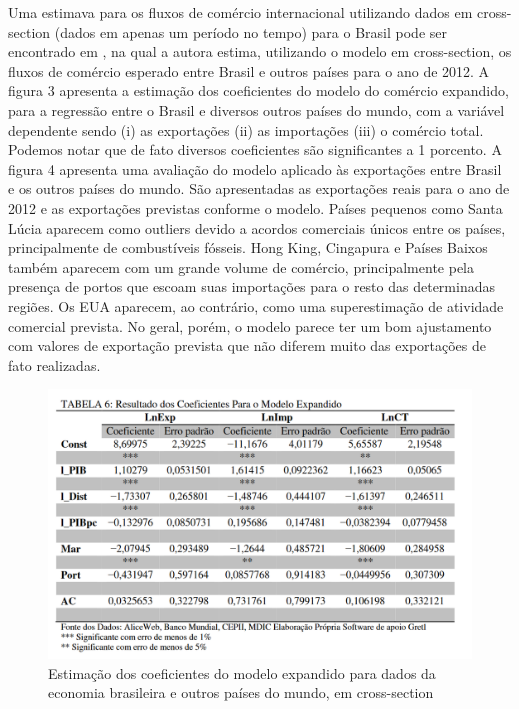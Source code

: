 \documentclass[12pt]{article}
\begin{document}
Uma estimava para os fluxos de comércio internacional utilizando dados em cross-section (dados em apenas um período no tempo) para o Brasil pode ser encontrado em \cite{beatriz1}, na qual a autora estima, utilizando o modelo em cross-section, os fluxos de comércio esperado entre Brasil e outros países para o ano de 2012. 
A figura 3 apresenta a estimação dos coeficientes do modelo do comércio expandido, para a regressão entre o Brasil e diversos outros países do mundo, com a variável dependente sendo (i) as exportações (ii) as importações (iii) o comércio total. Podemos notar que de fato diversos coeficientes são significantes a 1 porcento. 
A figura 4 apresenta uma avaliação do modelo aplicado às exportações entre Brasil e os outros países do mundo. São apresentadas as exportações reais para o ano de 2012 e as exportações previstas conforme o modelo. 
Países pequenos como Santa Lúcia aparecem como outliers devido a acordos comerciais únicos entre os países, principalmente de combustíveis fósseis. Hong King, Cingapura e Países Baixos também aparecem com um grande volume de comércio, principalmente pela presença de portos que escoam suas importações para o resto das determinadas regiões. Os EUA aparecem, ao contrário, como uma superestimação de atividade comercial prevista. No geral, porém, o modelo parece ter um bom ajustamento com valores de exportação prevista que não diferem muito das exportações de fato realizadas. 

\begin{figure}[h]
\centering
\includegraphics[width=1\textwidth]{crosssec.png}
\caption{\label{fig:coefscrossec}Estimação dos coeficientes do modelo expandido para dados da economia brasileira e outros países do mundo, em cross-section}

\end{figure}
\end{document}
